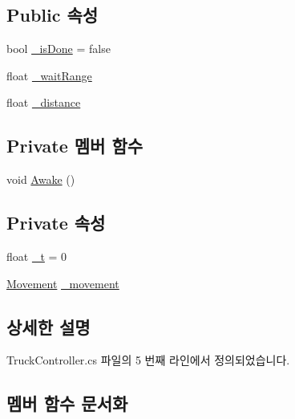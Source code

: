 \subsection*{Public 속성}
\begin{DoxyCompactItemize}
\item 
bool \mbox{\hyperlink{class_truck_controller_aac64df395a019ed3a6ebd50728e4190b}{\+\_\+is\+Done}} = false
\item 
float \mbox{\hyperlink{class_truck_controller_a796611411cda1af4b4f01ca3543b2d5e}{\+\_\+wait\+Range}}
\item 
float \mbox{\hyperlink{class_truck_controller_a938ec7adb51988affca922566d56a402}{\+\_\+distance}}
\end{DoxyCompactItemize}
\subsection*{Private 멤버 함수}
\begin{DoxyCompactItemize}
\item 
void \mbox{\hyperlink{class_truck_controller_ae262698bc9cadb7e91b85b9126913554}{Awake}} ()
\end{DoxyCompactItemize}
\subsection*{Private 속성}
\begin{DoxyCompactItemize}
\item 
float \mbox{\hyperlink{class_truck_controller_a0d7eb82e03d2f76581072996494b720a}{\+\_\+t}} = 0
\item 
\mbox{\hyperlink{class_movement}{Movement}} \mbox{\hyperlink{class_truck_controller_a7203e966d38b303e9156e10e4167197e}{\+\_\+movement}}
\end{DoxyCompactItemize}


\subsection{상세한 설명}


Truck\+Controller.\+cs 파일의 5 번째 라인에서 정의되었습니다.



\subsection{멤버 함수 문서화}
\mbox{\label{class_truck_controller_ac29bd47e974e18d696bae4ee586e9083}} 
